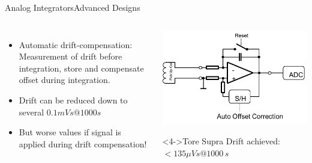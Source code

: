 \documentclass{beamer}
\begin{document}
\begin{frame}{Analog Integrators}{Advanced Designs}
\begin{columns}
	\begin{itemize}
		\item Automatic drift-compensation: Measurement of drift before integration, store and compensate offset during integration.
		\item<2-> Drift can be reduced down to  several $0.1mVs @ 1000s$
		\item<3->  But worse values if signal  is applied during drift  compensation!
	\end{itemize}
	\begin{center}
	\includegraphics[width=0.8\columnwidth]{toreSupreInt.png}
	\begin{block}<4->{Tore Supra} 
	Drift achieved: $ < 135 \mu Vs @ 1000\,  s$

	\end{block} 
	\end{center}
\end{columns}
\end{frame}

\end{document}
